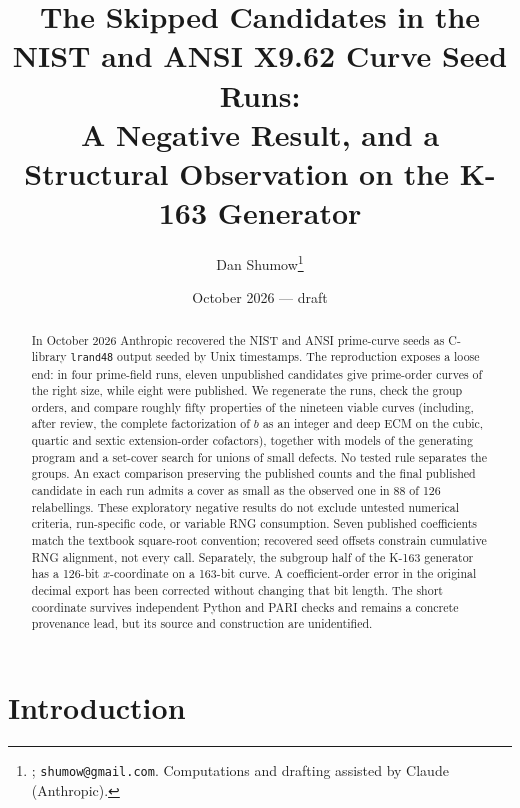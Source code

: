 \documentclass[11pt]{article}
\title{The Skipped Candidates in the NIST and ANSI X9.62 Curve Seed Runs:\\ A Negative Result, and a Structural Observation on the K-163 Generator}
\author{Dan Shumow\thanks{\todo{affiliation}; \texttt{shumow@gmail.com}. Computations and drafting assisted by Claude (Anthropic).}}
\date{October 2026 --- draft}
\newcommand{\lrand}{\texttt{lrand48}}
\begin{document}
\maketitle

\begin{abstract}
In October 2026 Anthropic recovered the NIST and ANSI prime-curve seeds as C-library \lrand{} output seeded by Unix timestamps. The reproduction exposes a loose end: in four prime-field runs, eleven unpublished candidates give prime-order curves of the right size, while eight were published. We regenerate the runs, check the group orders, and compare roughly fifty properties of the nineteen viable curves (including, after review, the complete factorization of $b$ as an integer and deep ECM on the cubic, quartic and sextic extension-order cofactors), together with models of the generating program and a set-cover search for unions of small defects. No tested rule separates the groups. An exact comparison preserving the published counts and the final published candidate in each run admits a cover as small as the observed one in 88 of 126 relabellings. These exploratory negative results do not exclude untested numerical criteria, run-specific code, or variable RNG consumption. Seven published coefficients match the textbook square-root convention; recovered seed offsets constrain cumulative RNG alignment, not every call. Separately, the subgroup half of the K-163 generator has a 126-bit $x$-coordinate on a 163-bit curve. A coefficient-order error in the original decimal export has been corrected without changing that bit length. The short coordinate survives independent Python and PARI checks and remains a concrete provenance lead, but its source and construction are unidentified.
\end{abstract}

\section{Introduction}
\end{document}
